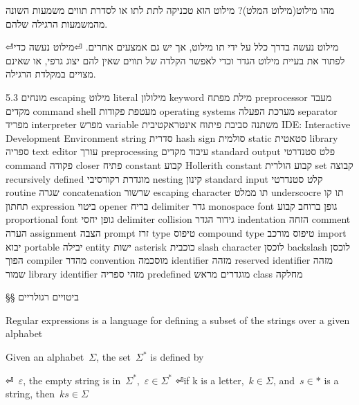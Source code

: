         מהו מילוט(מילוט המלט)?
        מילוט הוא טכניקה לתת לתו או לסדרת תווים משמעות השונה מהמשמעות הרגילה שלהם.
        \begin{ציינון}
⏎מילוט נעשה בדרך כלל על ידי תו מילוט, אך יש גם אמצעים אחרים.
⏎מילוט נעשה כדי לפתור את בעיית מילוט הגדר וכדי לאפשר הקלדה של תווים שאין להם יצוג גרפי, או שאינם מצויים במקלדת הרגילה.
      \end{ציינון}

        5.3 מונחים
        escaping מילוט
        literal מילולון
        keyword מילת מפתח
        preprocessor מעבד מקדים
        command shell מעטפת פקודות
        operating systems מערכת הפעלה
        separator מפריד
        interpreter מפרש
        variable משתנה
        סביבת פיתוח אינטראקטיבית
        IDE: Interactive Development Environment
        string סדרית
        hash sign סולמית
        static סטאטית
        library ספריה
        text editor עורך
        preprocessing עיבוד מקדים
        standard output פלט סטנדרטי
        command פקודה
        closer פתיח
        constant קבוע
        Hollerith constant קבוע הולרית
        set קבוצה
        recursively defined מוגדרת רקורסיבי
        nesting קינון
        standard input קלט סטנדרטי
        routine שגרה
        concatenation שרשור
        escaping character תו ממלט
        underscocre תו קו תחתון
        expression ביטוי
        opener בריח
        delimiter גדר
        monospace font גופן ברוחב קבוע
        proportional font גופן יחסי
        delimiter collision גידור הגדר
        indentation הזחה
        comment הערה
        assignment הצבה
        prompt זרז
        type טיפוס
        compound type טיפוס מורכב
        import יבוא
        portable יבילה
        entity ישות
        asterisk כוכבית
        slash character לוכסן
        backslash לוכסן הפוך
        compiler מהדר
        convention מוסכמה
        identifier מזהה
        reserved identifier מזהה שמור
        library identifier מזהי ספריה
        predefined מוגדרים מראש
        class מחלקה

§§ ביטויים רגולריים

        Regular expressions is a language for defining a subset of the strings
        over a given alphabet

        Given an alphabet~$Σ$, the set~$Σ^*$ is defined by
            \begin{ציינון}
⏎~$ε$, the empty string is in~$Σ^*$,~$ε∈Σ^*$
⏎if k is a letter,~$k∈Σ$, and~$s∈*$ is a string, then~$ks∈Σ$
        \end{ציינון}

